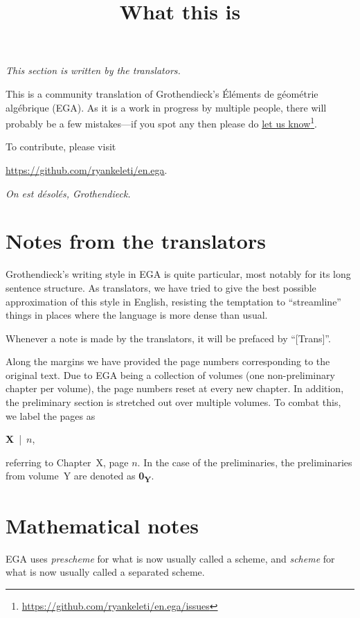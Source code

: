 
\title{What this is}
\maketitle

\label{section-phantom}

\noindent
{\em This section is written by the translators.}

\noindent
This is a community translation of Grothendieck's \'El\'ements de g\'eom\'etrie alg\'ebrique (EGA).
As it is a work in progress by multiple people, there will probably be a few mistakes---if you spot any then please do \href{https://github.com/ryankeleti/en.ega/issues}{let us know}\footnote{\url{https://github.com/ryankeleti/en.ega/issues}}.

\noindent
To contribute, please visit
\begin{center}
  \url{https://github.com/ryankeleti/en.ega}.
\end{center}

\noindent
{\em On est d\'esol\'es, Grothendieck.}

\section*{Notes from the translators}
Grothendieck's writing style in EGA is quite particular, most notably for its long sentence structure.
As translators, we have tried to give the best possible approximation of this style in English, resisting the temptation to ``streamline'' things in places where the language is more dense than usual.

\sectionbreak

Whenever a note is made by the translators, it will be prefaced by ``[Trans]''.

\sectionbreak

Along the margins we have provided the page numbers corresponding to the original text.
Due to EGA being a collection of volumes (one non-preliminary chapter per volume), the page numbers reset at every new chapter.
In addition, the preliminary section is stretched out over multiple volumes.
To combat this, we label the pages as
\begin{center}
  \textbf{X}~|~$n$,
\end{center}
referring to Chapter~X, page $n$.
In the case of the preliminaries, the preliminaries from volume~Y are denoted as \textbf{0\textsubscript{Y}}.

\section*{Mathematical notes}
EGA uses {\em prescheme} for what is now usually called a scheme, and {\em scheme} for what is now usually called a separated scheme.



